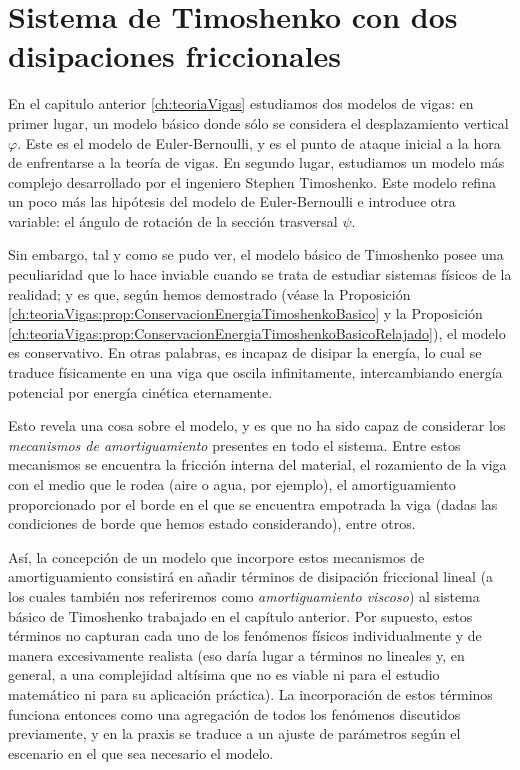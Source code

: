 \chapter{Sistema de Timoshenko con dos disipaciones friccionales}
\label{ch:TimoshenkoFric}

En el capitulo anterior \ref{ch:teoriaVigas} estudiamos dos modelos de vigas: en primer lugar, un modelo básico donde sólo se considera el desplazamiento vertical $\varphi$. Este es el modelo de Euler-Bernoulli, y es el punto de ataque inicial a la hora de enfrentarse a la teoría de vigas. En segundo lugar, estudiamos un modelo más complejo desarrollado por el ingeniero Stephen Timoshenko. Este modelo refina un poco más las hipótesis del modelo de Euler-Bernoulli e introduce otra variable: el ángulo de rotación de la sección trasversal $\psi$.

Sin embargo, tal y como se pudo ver, el modelo básico de Timoshenko posee una peculiaridad que lo hace inviable cuando se trata de estudiar sistemas físicos de la realidad; y es que, según hemos demostrado (véase la Proposición \ref{ch:teoriaVigas:prop:ConservacionEnergiaTimoshenkoBasico} y la Proposición \ref{ch:teoriaVigas:prop:ConservacionEnergiaTimoshenkoBasicoRelajado}), el modelo es conservativo. En otras palabras, es incapaz de disipar la energía, lo cual se traduce físicamente en una viga que oscila infinitamente, intercambiando energía potencial por energía cinética eternamente. 

Esto revela una cosa sobre el modelo, y es que no ha sido capaz de considerar los \textit{mecanismos de amortiguamiento} presentes en todo el sistema. Entre estos mecanismos se encuentra la fricción interna del material, el rozamiento de la viga con el medio que le rodea (aire o agua, por ejemplo), el amortiguamiento proporcionado por el borde en el que se encuentra empotrada la viga (dadas las condiciones de borde que hemos estado considerando), entre otros.

Así, la concepción de un modelo que incorpore estos mecanismos de amortiguamiento consistirá en añadir términos de disipación friccional lineal (a los cuales también nos referiremos como \textit{amortiguamiento viscoso}) al sistema básico de Timoshenko trabajado en el capítulo anterior. Por supuesto, estos términos no capturan cada uno de los fenómenos físicos individualmente y de manera excesivamente realista (eso daría lugar a términos no lineales y, en general, a una complejidad altísima que no es viable ni para el estudio matemático ni para su aplicación práctica). La incorporación de estos términos funciona entonces como una agregación de todos los fenómenos discutidos previamente, y en la praxis se traduce a un ajuste de parámetros según el escenario en el que sea necesario el modelo. 

